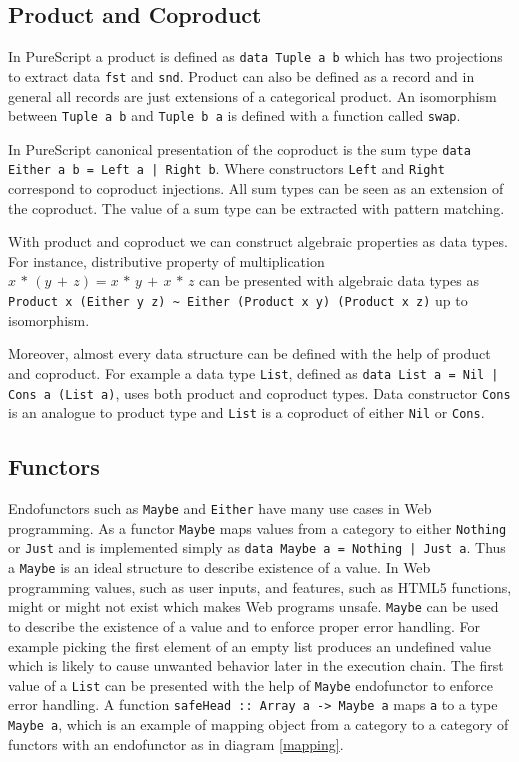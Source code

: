 \documentclass[article]{aaltoseries}
\begin{document}
  \subsection{Product and Coproduct}
    In PureScript a product is defined as \lstinline|data Tuple a b| which has
    two projections to extract data \lstinline|fst| and \lstinline|snd|. Product
    can also be defined as a record and in general all records are just
    extensions of a categorical product. An isomorphism between
    \lstinline|Tuple a b| and \lstinline|Tuple b a| is defined with a function
    called \lstinline|swap|.
    
    In PureScript canonical presentation of the coproduct is the sum type
    \lstinline{data Either a b = Left a | Right b}. Where constructors
    \lstinline|Left| and \lstinline|Right| correspond to coproduct injections.
    All sum types can be seen as an extension of the coproduct. The value of a
    sum type can be extracted with pattern matching.
    
    With product and coproduct we can construct algebraic properties as data
    types. For instance, distributive property of multiplication $x\,*\,(y\,+\,z) =
    x\,*\,y\,+\,x\,*\,z$ can be presented with algebraic data types as
    \lstinline|Product x (Either y z) ~ Either (Product x y) (Product x z)| up
    to isomorphism.

    Moreover, almost every data structure can be defined with the help of
    product and coproduct. For example a data type \lstinline|List|, defined as
    \lstinline{data List a = Nil | Cons a (List a)}, uses both product and
    coproduct types. Data constructor \lstinline|Cons| is an analogue to product
    type and \lstinline|List| is a coproduct of either \lstinline|Nil| or \lstinline|Cons|.

    

  \subsection{Functors}
    Endofunctors such as \lstinline|Maybe| and \lstinline|Either| have many use
    cases in Web programming. As a functor \lstinline|Maybe| maps values from a
    category to either \lstinline|Nothing| or \lstinline|Just| and is
    implemented simply as \lstinline{data Maybe a = Nothing | Just a}. Thus a
    \lstinline|Maybe| is an ideal structure to describe existence of a value. In
    Web programming values, such as user inputs, and features, such as HTML5
    functions, might or might not exist which makes Web programs unsafe.
    \lstinline|Maybe| can be used to describe the existence of a value and to enforce
    proper error handling. For example picking the first element of an empty
    list produces an undefined value which is likely to cause unwanted behavior
    later in the execution chain. The first value of a \lstinline|List| can be
    presented with the help of \lstinline|Maybe| endofunctor to enforce error
    handling. A function \lstinline|safeHead :: Array a -> Maybe a| maps
    \lstinline|a| to a type \lstinline|Maybe a|, which is an example of mapping
    object from a category to a category of functors with an endofunctor as in
    diagram \ref{mapping}.
\end{document}
